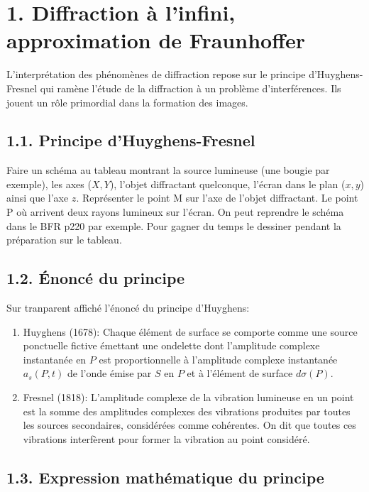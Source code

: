 \documentclass[french, a4paper, 10pt, twocolumn, landscape]{article}
\begin{document}
\section*{1. Diffraction à l'infini, approximation de Fraunhoffer}

L'interprétation des phénomènes de diffraction repose sur le principe d'Huyghens-Fresnel qui ramène l'étude de la diffraction à un problème d'interférences. Ils jouent un rôle primordial dans la formation des images.

\subsection*{1.1. Principe d'Huyghens-Fresnel}

Faire un schéma au tableau montrant la source lumineuse (une bougie par exemple), les axes ($X,Y$), l'objet diffractant quelconque, l'écran dans le plan ($x,y$) ainsi que l'axe $z$. Représenter le point M sur l'axe de l'objet diffractant. Le point P où arrivent deux rayons lumineux sur l'écran. On peut reprendre le schéma dans le BFR p220 par exemple. Pour gagner du temps le dessiner pendant la préparation sur le tableau.

\subsection*{1.2. Énoncé du principe}

Sur tranparent affiché l'énoncé du principe d'Huyghens: 

\begin{enumerate}
	\item Huyghens (1678): Chaque élément de surface se comporte comme une source ponctuelle fictive émettant une ondelette dont l'amplitude complexe instantanée en $P$ est proportionnelle à l'amplitude complexe instantanée $a_s(P,t)$ de l'onde émise par $S$ en $P$ et à l'élément de surface $d\sigma(P)$.
	\item Fresnel (1818): L'amplitude complexe de la vibration lumineuse en un point est la somme des amplitudes complexes des vibrations produites par toutes les sources secondaires, considérées comme cohérentes. On dit que toutes ces vibrations interfèrent pour former la vibration au point considéré. 
\end{enumerate}

\subsection*{1.3. Expression mathématique du principe}
\end{document}
